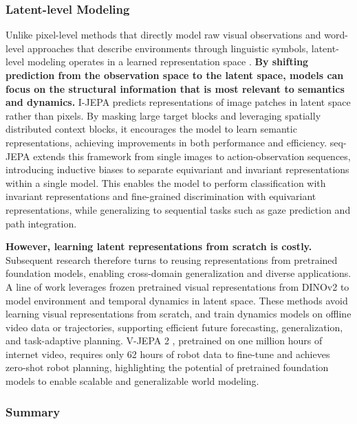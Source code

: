 \subsubsection{Latent-level Modeling}
\label{sec:Latent-level Modeling}
Unlike pixel-level methods that directly model raw visual observations and word-level approaches that describe environments through linguistic symbols, latent-level modeling operates in a learned representation space \cite{IWM, DINO-WM, seq-JEPA}. 
\textbf{By shifting prediction from the observation space to the latent space, models can focus on the structural information that is most relevant to semantics and dynamics.} I-JEPA \cite{I-JEPA} predicts representations of image patches in latent space rather than pixels. By masking large target blocks and leveraging spatially distributed context blocks, it encourages the model to learn semantic representations, achieving improvements in both performance and efficiency. seq-JEPA \cite{seq-JEPA} extends this framework from single images to action-observation sequences, introducing inductive biases to separate equivariant and invariant representations within a single model. This enables the model to perform classification with invariant representations and fine-grained discrimination with equivariant representations, while generalizing to sequential tasks such as gaze prediction and path integration.

\textbf{However, learning latent representations from scratch is costly.} Subsequent research therefore turns to reusing representations from pretrained foundation models, enabling cross-domain generalization and diverse applications. A line of work \cite{DINO-WM, DINO-world, DINO-Foresight} leverages frozen pretrained visual representations from DINOv2 to model environment and temporal dynamics in latent space. These methods avoid learning visual representations from scratch, and train dynamics models on offline video data or trajectories, supporting efficient future forecasting, generalization, and task-adaptive planning. V-JEPA 2 \cite{V-JEPA_2}, pretrained on one million hours of internet video, requires only 62 hours of robot data to fine-tune and achieves zero-shot robot planning, highlighting the potential of pretrained foundation models to enable scalable and generalizable world modeling.


\subsubsection{Summary}

